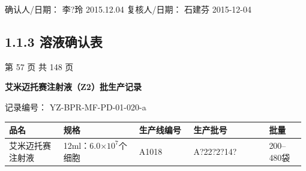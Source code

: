 \documentclass[UTF8,10pt,a4paper,fontset=fandol]{ctexart}
\newcommand{\fieldvalue}[1]{#1}
\newcommand{\handwritten}[1]{#1}
\begin{document}
\vspace{0.5em}

确认人/日期：
\fieldvalue{\handwritten{李?玲}}
\quad
\fieldvalue{\handwritten{2015.12.04}}
\hfill
复核人/日期：
\fieldvalue{\handwritten{石建芬}}
\quad
\fieldvalue{\handwritten{2015-12-04}}

\subsection{1.1.3 溶液确认表}

\vfill

\begin{center}
第 57 页 共 148 页
\end{center}

\newpage

\begin{center}
\textbf{艾米迈托赛注射液（Z2）批生产记录}
\end{center}

记录编号：
\fieldvalue{YZ-BPR-MF-PD-01-020-a}

\begin{tabular}{|p{0.18\linewidth}|p{0.25\linewidth}|p{0.18\linewidth}|p{0.25\linewidth}|p{0.12\linewidth}|}
\hline
品名 & 规格 & 生产线编号 & 生产批号 & 批量 \\
\hline
艾米迈托赛注射液 & 12ml：6.0$\times 10^{7}$个细胞 &
\fieldvalue{\handwritten{A1018}} &
\fieldvalue{\handwritten{A?22?2?14?}} &
\fieldvalue{200--480袋}
\\
\hline
\end{tabular}

\vspace{0.3em}
\end{document}
